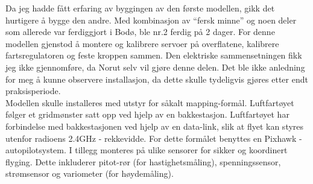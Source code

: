 \documentclass[12pt, a4paper]{article}
\begin{document}
Da jeg hadde fått erfaring av byggingen av den første modellen, gikk det hurtigere å bygge den andre. Med kombinasjon av ``fersk minne'' og noen deler som allerede var ferdiggjort i Bodø, ble nr.2 ferdig på 2 dager. For denne modellen gjenstod å montere og kalibrere servoer på overflatene, kalibrere fartsregulatoren og feste kroppen sammen. Den elektriske sammensetningen fikk jeg ikke gjennomføre, da Norut selv vil gjøre denne delen. Det ble ikke anledning for meg å kunne observere installasjon, da dette skulle tydeligvis gjøres etter endt praksisperiode. \\
Modellen skulle installeres med utstyr for såkalt mapping-formål. Luftfartøyet følger et gridmønster satt opp ved hjelp av en bakkestasjon. Luftfartøyet har forbindelse med bakkestasjonen ved hjelp av en data-link, slik at flyet kan styres utenfor radioens 2.4GHz - rekkevidde. For dette formålet benyttes en Pixhawk - autopilotsystem. I tillegg monteres på ulike sensorer for sikker og koordinert flyging. Dette inkluderer pitot-rør (for hastighetsmåling), spenningssensor, strømsensor og variometer (for høydemåling). 
\end{document}

